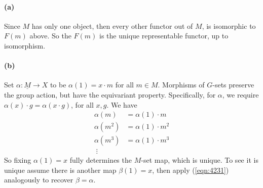 \documentclass{article}
\begin{document}
\paragraph{(a)} Since $M$ has only one object, then every other functor out of $M$, is isomorphic to $F(m)$ above. So the $F(m)$ is the unique representable functor, up to isomorphism.

\paragraph{(b)} Set $\alpha\colon \underline{M}  \rightarrow X$ to be $\alpha(1) = x \cdot m$ for all $m \in M$. Morphisms of $G$-sets preserve the group action, but have the equivariant property. Specifically, for $\alpha$, we require $\alpha(x) \cdot g = \alpha (x \cdot g)$, for all $x, g$. We have
\begin{equation}
\label{eqn:4231}
\begin{aligned}
  \alpha(m) &= \alpha(1) \cdot m \\
  \alpha(m^2) &= \alpha(1) \cdot m^2 \\
  \alpha(m^3) &= \alpha(1) \cdot m^3 \\
  \; \vdots
\end{aligned}
\end{equation}
So fixing $\alpha(1) = x$ fully determines the $M$-set map, which is unique. To see it is unique assume there is another map $\beta(1) = x$, then apply (\ref{eqn:4231}) analogously to recover $\beta = \alpha$.
\end{document}
